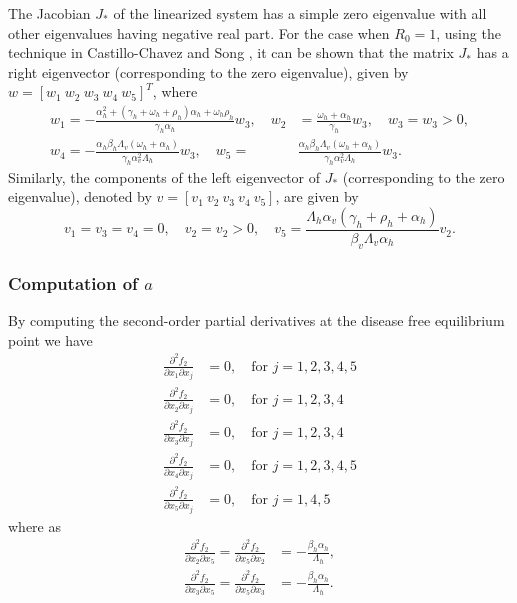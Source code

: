 \documentclass[review]{elsarticle}
\begin{document}
The Jacobian $J_*$ of the linearized system has a simple zero eigenvalue with all other eigenvalues having negative real part. For the case when $R_0=1$, using the technique in Castillo-Chavez and Song \cite{Song}, it can be shown that the matrix $J_*$ has a right eigenvector (corresponding to the zero eigenvalue), given by $w=[w_1\ w_2\ w_3\ w_4\ w_5]^T$, where
\begin{align*}
w_1=-\frac{\alpha_h^2+(\gamma_h+\omega_h +\rho_h)\alpha_h+\omega_h\rho_h}{\gamma_h\alpha_h}w_3,\quad w_2&=\frac{\omega_h+\alpha_h}{\gamma_h}w_3,\quad w_3=w_3>0,\\
w_4=-\frac{\alpha_h\beta_h\Lambda_v(\omega_h+\alpha_h)}{\gamma_h\alpha_v^2\Lambda_h}w_3,\quad w_5=&\frac{\alpha_h\beta_h\Lambda_v(\omega_h+\alpha_h)}{\gamma_h\alpha_v^2\Lambda_h}w_3.
\end{align*}
 Similarly, the components of the left eigenvector of $J_*$ (corresponding to the zero eigenvalue), denoted by $v=[v_1\ v_2\ v_3\ v_4\ v_5]$, are given by
\[
v_1=v_3=v_4=0,\quad v_2=v_2>0,\quad v_5=\frac{\Lambda_h\alpha_v(\gamma_h +\rho_h +\alpha_h)}{\beta_v\Lambda_v\alpha_h}v_2.
\]

\subsubsection*{Computation of $a$}
By computing the second-order partial derivatives at the disease free equilibrium point we have
\begin{align*}
\frac{\partial^2 f_2}{\partial x_1\partial x_j} & =0,\quad\mbox{for } j=1,2,3,4,5\\
\frac{\partial^2 f_2}{\partial x_2\partial x_j} & =0,\quad\mbox{for } j=1,2,3,4\\
\frac{\partial^2 f_2}{\partial x_3\partial x_j} & =0,\quad\mbox{for } j=1,2,3,4\\
\frac{\partial^2 f_2}{\partial x_4\partial x_j} & =0,\quad\mbox{for } j=1,2,3,4,5\\
\frac{\partial^2 f_2}{\partial x_5\partial x_j} & =0,\quad\mbox{for } j=1,4,5
\end{align*}
where as
\begin{align*}
\frac{\partial^2 f_2}{\partial x_2\partial x_5}=\frac{\partial^2 f_2}{\partial x_5\partial x_2}& =-\frac{\beta_h\alpha_h}{\Lambda_h},\\
\frac{\partial^2 f_2}{\partial x_3\partial x_5}=\frac{\partial^2 f_2}{\partial x_5\partial x_3}& =-\frac{\beta_h\alpha_h}{\Lambda_h}.
\end{align*}
\end{document}
